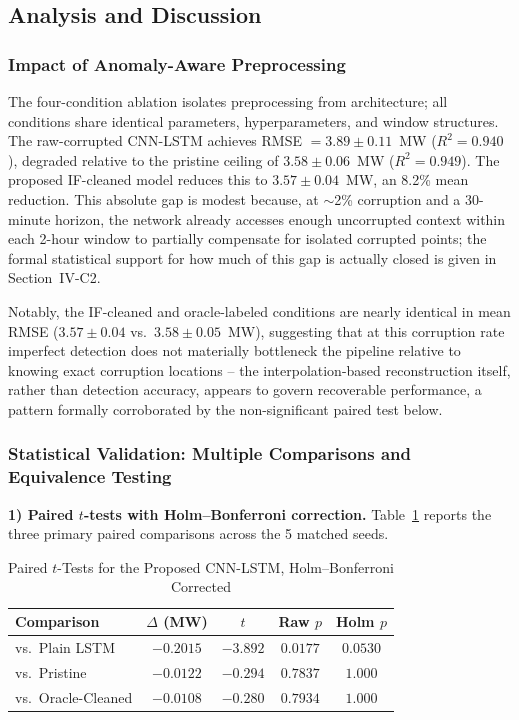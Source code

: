 \documentclass[conference]{IEEEtran}
\begin{document}
\FloatBarrier

\subsection{Analysis and Discussion}

\subsubsection{Impact of Anomaly-Aware Preprocessing}
The four-condition ablation isolates preprocessing from architecture; all conditions share identical parameters, hyperparameters, and window structures. The raw-corrupted CNN-LSTM achieves RMSE $=3.89 \pm 0.11$~MW ($R^2 = 0.940$), degraded relative to the pristine ceiling of $3.58 \pm 0.06$~MW ($R^2 = 0.949$). The proposed IF-cleaned model reduces this to $3.57 \pm 0.04$~MW, an 8.2\% mean reduction. This absolute gap is modest because, at $\sim$2\% corruption and a 30-minute horizon, the network already accesses enough uncorrupted context within each 2-hour window to partially compensate for isolated corrupted points; the formal statistical support for how much of this gap is actually closed is given in Section~IV-C2.

Notably, the IF-cleaned and oracle-labeled conditions are nearly identical in mean RMSE ($3.57 \pm 0.04$ vs.\ $3.58 \pm 0.05$~MW), suggesting that at this corruption rate imperfect detection does not materially bottleneck the pipeline relative to knowing exact corruption locations -- the interpolation-based reconstruction itself, rather than detection accuracy, appears to govern recoverable performance, a pattern formally corroborated by the non-significant paired test below.

\subsubsection{Statistical Validation: Multiple Comparisons and Equivalence Testing}
\label{sec:stats_results}

\textbf{1) Paired $t$-tests with Holm--Bonferroni correction.} Table~\ref{tab:stats} reports the three primary paired comparisons across the 5 matched seeds.

\begin{table}[H]
\centering
\caption{Paired $t$-Tests for the Proposed CNN-LSTM, Holm--Bonferroni Corrected}
\label{tab:stats}
\footnotesize
\begin{tabular}{@{}lcccc@{}}
\toprule
\textbf{Comparison} & \textbf{$\Delta$ (MW)} & \textbf{$t$} & \textbf{Raw $p$} & \textbf{Holm $p$} \\
\midrule
vs.\ Plain LSTM   & $-0.2015$ & $-3.892$ & $0.0177$ & $0.0530$ \\
vs.\ Pristine     & $-0.0122$ & $-0.294$ & $0.7837$ & $1.000$ \\
vs.\ Oracle-Cleaned & $-0.0108$ & $-0.280$ & $0.7934$ & $1.000$ \\
\bottomrule
\end{tabular}
\end{table}
\end{document}
